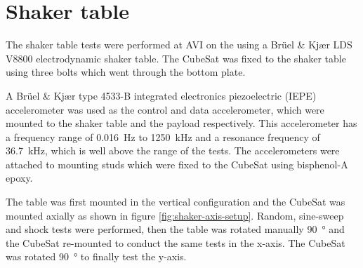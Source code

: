 \documentclass[]{report}
\begin{document}
\section{Shaker table}

The shaker table tests were performed at AVI on the  using a Brüel \& Kjær LDS V8800 electrodynamic shaker table. The CubeSat was fixed to the shaker table using three bolts which went through the bottom plate.

A Brüel \& Kjær type 4533-B integrated electronics piezoelectric (IEPE) accelerometer was used as the control and data accelerometer, which were mounted to the shaker table and the payload respectively. This accelerometer has a frequency range of \SI{0.016}{\hertz} to \SI{1250}{\kilo\hertz} and a resonance frequency of \SI{36.7}{\kilo\hertz}, which is well above the range of the tests. The accelerometers were attached to mounting studs which were fixed to the CubeSat using bisphenol-A epoxy.

The table was first mounted in the vertical configuration and the CubeSat was mounted axially as shown in figure \ref{fig:shaker-axis-setup}. Random, sine-sweep and shock tests were performed, then the table was rotated manually \SI{90}{\degree} and the CubeSat re-mounted to conduct the same tests in the x-axis. The CubeSat was rotated \SI{90}{\degree} to finally test the y-axis.
\end{document}
